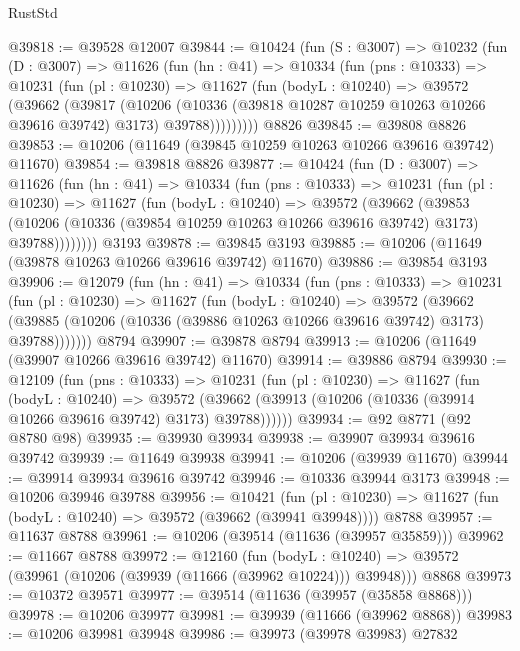 \begin{lexlean}{RustStd}
\begin{coremodule}
@39818 := @39528 @12007
@39844 := @10424
    (fun (S : @3007) =>
    @10232
      (fun (D : @3007) =>
      @11626
        (fun (hn : @41) =>
        @10334
          (fun (pns : @10333) =>
          @10231
            (fun (pl : @10230) =>
            @11627
              (fun (bodyL : @10240) =>
              @39572
                (@39662
                  (@39817
                    (@10206
                      (@10336 (@39818 @10287 @10259 @10263 @10266 @39616 @39742) @3173)
                      @39788)))))))))
    @8826
@39845 := @39808 @8826
@39853 := @10206 (@11649 (@39845 @10259 @10263 @10266 @39616 @39742) @11670)
@39854 := @39818 @8826
@39877 := @10424
    (fun (D : @3007) =>
    @11626
      (fun (hn : @41) =>
      @10334
        (fun (pns : @10333) =>
        @10231
          (fun (pl : @10230) =>
          @11627
            (fun (bodyL : @10240) =>
            @39572
              (@39662
                (@39853
                  (@10206 (@10336 (@39854 @10259 @10263 @10266 @39616 @39742) @3173) @39788))))))))
    @3193
@39878 := @39845 @3193
@39885 := @10206 (@11649 (@39878 @10263 @10266 @39616 @39742) @11670)
@39886 := @39854 @3193
@39906 := @12079
    (fun (hn : @41) =>
    @10334
      (fun (pns : @10333) =>
      @10231
        (fun (pl : @10230) =>
        @11627
          (fun (bodyL : @10240) =>
          @39572
            (@39662
              (@39885 (@10206 (@10336 (@39886 @10263 @10266 @39616 @39742) @3173) @39788)))))))
    @8794
@39907 := @39878 @8794
@39913 := @10206 (@11649 (@39907 @10266 @39616 @39742) @11670)
@39914 := @39886 @8794
@39930 := @12109
    (fun (pns : @10333) =>
    @10231
      (fun (pl : @10230) =>
      @11627
        (fun (bodyL : @10240) =>
        @39572 (@39662 (@39913 (@10206 (@10336 (@39914 @10266 @39616 @39742) @3173) @39788))))))
@39934 := @92 @8771 (@92 @8780 @98)
@39935 := @39930 @39934
@39938 := @39907 @39934 @39616 @39742
@39939 := @11649 @39938
@39941 := @10206 (@39939 @11670)
@39944 := @39914 @39934 @39616 @39742
@39946 := @10336 @39944 @3173
@39948 := @10206 @39946 @39788
@39956 := @10421
    (fun (pl : @10230) => @11627 (fun (bodyL : @10240) => @39572 (@39662 (@39941 @39948))))
    @8788
@39957 := @11637 @8788
@39961 := @10206 (@39514 (@11636 (@39957 @35859)))
@39962 := @11667 @8788
@39972 := @12160
    (fun (bodyL : @10240) => @39572 (@39961 (@10206 (@39939 (@11666 (@39962 @10224))) @39948)))
    @8868
@39973 := @10372 @39571
@39977 := @39514 (@11636 (@39957 (@35858 @8868)))
@39978 := @10206 @39977
@39981 := @39939 (@11666 (@39962 @8868))
@39983 := @10206 @39981 @39948
@39986 := @39973 (@39978 @39983) @27832

\end{coremodule}
\end{lexlean}
